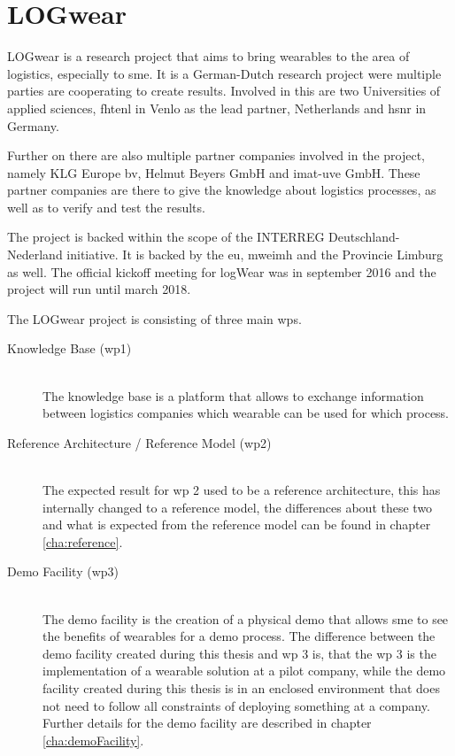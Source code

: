 \section{LOGwear}\label{sec:logwear}
LOGwear is a research project that aims to bring wearables to the area of logistics, especially to \gls{sme}. It is a German-Dutch research project were multiple parties are cooperating to create results. Involved in this are two Universities of applied sciences, \gls{fhtenl} in Venlo as the lead partner, Netherlands and \gls{hsnr} in Germany.

Further on there are also multiple partner companies involved in the project, namely KLG Europe bv, Helmut Beyers GmbH and imat-uve GmbH. These partner companies are there to give the knowledge about logistics processes, as well as to verify and test the results.

The project is backed within the scope of the INTERREG Deutschland-Nederland initiative. It is backed by the \gls{eu}, \gls{mweimh} and the Provincie Limburg as well. The official kickoff meeting for logWear was in september 2016 and the project will run until march 2018. 

The LOGwear project is consisting of three main \gls{wp}s. \citep{website:logwear}
\begin{description}
	\item[Knowledge Base (\gls{wp}1)] \hfill \\
		The knowledge base is a platform that allows to exchange information between logistics companies which wearable can be used for which process. \citep{bachelorThesis:oliver} \citep{bachelorThesis:sascha}
	\item[Reference Architecture / Reference Model (\gls{wp}2)] \hfill \\
		The expected result for \gls{wp} 2 used to be a reference architecture, this has internally changed to a reference model, the differences about these two and what is expected from the reference model can be found in chapter \ref{cha:reference}. 
	\item[Demo Facility (\gls{wp}3)] \hfill \\
		The demo facility is the creation of a physical demo that allows \gls{sme} to see the benefits of wearables for a demo process. The difference between the demo facility created during this thesis and \gls{wp} 3 is, that the \gls{wp} 3 is the implementation of a wearable solution at a pilot company, while the demo facility created during this thesis is in an enclosed environment that does not need to follow all constraints of deploying something at a company. Further details for the demo facility are described in chapter \ref{cha:demoFacility}. 
\end{description}